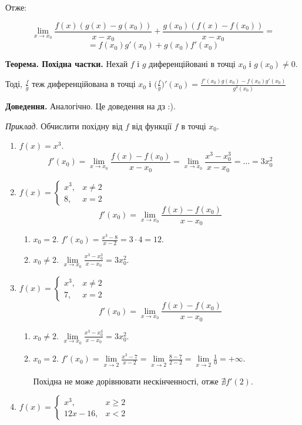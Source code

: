 \documentclass[12pt]{report}
\begin{document}
Отже:

$$\lim_{x \to x_0} \frac{f(x)(g(x) - g(x_0))}{x - x_0} + \frac{g(x_0)(f(x) - f(x_0))}{x - x_0} = $$
$$= f(x_0) g'(x_0) + g(x_0) f'(x_0)$$

\textbf{Теорема. Похідна частки.} Нехай $f$ і $g$ диференційовані в точці $x_0$ і $g(x_0) \neq 0$.

Тоді, $\frac{f}{g}$ теж диференційована в точці $x_0$ і $\Big(\frac{f}{g} \Big)'(x_0) = \frac{f'(x_0) g(x_0) - f(x_0)g'(x_0)}{g^2(x_0)}$

\textbf{Доведення.} Аналогічно. Це доведення на дз :).

\textit{Приклад.} Обчислити похідну від $f$ від функції $f$ в точці $x_0$.
\begin{enumerate}

\item $f(x) = x^3$.
$$f'(x_0) = \lim_{x\to x_0}\frac{f(x) - f(x_0)}{x - x_0} = \lim_{x\to x_0}\frac{x^3 - x_0^3}{x - x_0} = \ldots = 3 x_0^2$$

\item $f(x) = \begin{cases} x^3,& x \neq 2 \\ 8, & x = 2\end{cases}$
$$f'(x_0) = \lim_{x \to x_0}\frac{f(x) - f(x_0)}{x - x_0}$$
\begin{enumerate}
\item $x_0 = 2$. $f'(x_0) = \frac{x^3 - 8}{x - 2} = 3 \cdot 4 = 12.$
\item $x_0 \neq 2$. $\lim\limits_{x \to x_0} \frac{x^3 - x_0^3}{x - x_0} = 3 x_0^2$. 
\end{enumerate}

\item $f(x) = \begin{cases} x^3,& x \neq 2 \\ 7, & x = 2\end{cases}$
$$f'(x_0) = \lim_{x \to x_0}\frac{f(x) - f(x_0)}{x - x_0}$$
\begin{enumerate}
\item $x_0 \neq 2$. $\lim\limits_{x \to x_0} \frac{x^3 - x_0^3}{x - x_0} = 3 x_0^2$. 
\item $x_0 = 2$. $f'(x_0) = \lim\limits_{x\to 2}\frac{x^3 - 7}{x - 2} = \lim\limits_{x\to 2}\frac{8 - 7}{2 - 2} = \lim\limits_{x\to 2}\frac{1}{0} = +\infty$.

Похідна не може дорівнювати нескінченності, отже $\nexists f'(2)$. 
\end{enumerate}

\item $f(x) = \begin{cases} x^3,& x \geq 2 \\ 12x - 16, & x < 2\end{cases}$


\end{enumerate}
\end{document}
